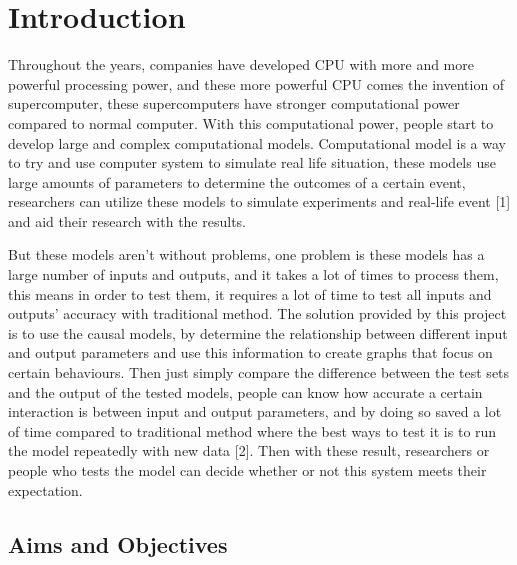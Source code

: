 \chapter{Introduction}

Throughout the years, companies have developed CPU with more and more powerful processing power, and these more powerful CPU comes the invention of supercomputer, these supercomputers have stronger computational power compared to normal computer. With this computational power, people start to develop large and complex computational models. Computational model is a way to try and use computer system to simulate real life situation, these models use large amounts of parameters to determine the outcomes of a certain event, researchers can utilize these models to simulate experiments and real-life event [1] and aid their research with the results. 

But these models aren’t without problems, one problem is these models has a large number of inputs and outputs, and it takes a lot of times to process them, this means in order to test them, it requires a lot of time to test all inputs and outputs’ accuracy with traditional method. 
The solution provided by this project is to use the causal models, by determine the relationship between different input and output parameters and use this information to create graphs that focus on certain behaviours. Then just simply compare the difference between the test sets and the output of the tested models, people can know how accurate a certain interaction is between input and output parameters, and by doing so saved a lot of time compared to traditional method where the best ways to test it is to run the model repeatedly with new data [2]. Then with these result, researchers or people who tests the model can decide whether or not this system meets their expectation.  


\section{Aims and Objectives}

